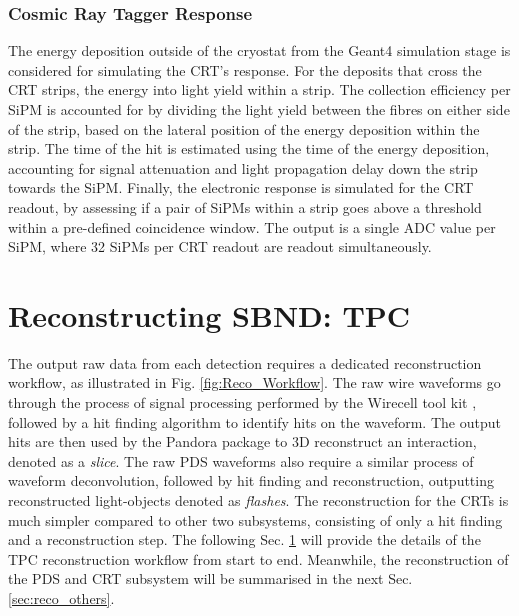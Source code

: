 \subsubsection{Cosmic Ray Tagger Response}

The energy deposition outside of the cryostat from the Geant4 simulation stage is considered for simulating the CRT's response.
For the deposits that cross the CRT strips, the energy into light yield within a strip.
The collection efficiency per SiPM is accounted for by dividing the light yield between the fibres on either side of the strip, based on the lateral position of the energy deposition within the strip. 
The time of the hit is estimated using the time of the energy deposition, accounting for signal attenuation and light propagation delay down the strip towards the SiPM.
Finally, the electronic response is simulated for the CRT readout, by assessing if a pair of SiPMs within a strip goes above a threshold within a pre-defined coincidence window.
The output is a single ADC value per SiPM, where 32 SiPMs per CRT readout are readout simultaneously. 


\section{Reconstructing SBND: TPC}
\label{sec:reco_tpc}
The output raw data from each detection requires a dedicated reconstruction workflow, as illustrated in Fig. \ref{fig:Reco_Workflow}.
The raw wire waveforms go through the process of signal processing performed by the Wirecell tool kit \cite{wirecell}, followed by a hit finding algorithm to identify hits on the waveform.
The output hits are then used by the Pandora package \cite{pandora} to 3D reconstruct an interaction, denoted as a \textit{slice}.
The raw PDS waveforms also require a similar process of waveform deconvolution, followed by hit finding and reconstruction, outputting reconstructed light-objects denoted as \textit{flashes}.
The reconstruction for the CRTs is much simpler compared to other two subsystems, consisting of only a hit finding and a reconstruction step. 
The following Sec. \ref{sec:reco_tpc} will provide the details of the TPC reconstruction workflow from start to end.
Meanwhile, the reconstruction of the PDS and CRT subsystem will be summarised in the next Sec. \ref{sec:reco_others}.

